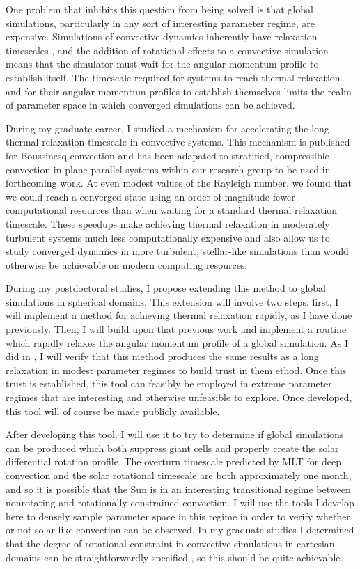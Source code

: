 \documentclass[aasms,12pt]{article}
\begin{document}
One problem that inhibits this question from being solved is that global simulations, particularly in any sort of interesting parameter regime, are expensive.
Simulations of convective dynamics inherently have relaxation timescales \citep{anders&all2018}, and the addition of rotational effects to a convective simulation means that the simulator must wait for the angular momentum profile to establish itself.
The timescale required for systems to reach thermal relaxation and for their angular momentum profiles to establish themselves limits the realm of parameter space in which converged simulations can be achieved.

During my graduate career, I studied a mechanism for accelerating the long thermal relaxation timescale in convective systems.
This mechanism is published for Boussinesq convection \citep{anders&all2018} and has been adapated to stratified, compressible convection in plane-parallel systems within our research group to be used in forthcoming work.
At even modest values of the Rayleigh number, we found that we could reach a converged state using an order of magnitude fewer computational resources than when waiting for a standard thermal relaxation timescale.
These speedups make achieving thermal relaxation in moderately turbulent systems much less computationally expensive and also allow us to study converged dynamics in more turbulent, stellar-like simulations than would otherwise be achievable on modern computing resources.

During my postdoctoral studies, I propose extending this method to global simulations in spherical domains.
This extension will involve two steps: first, I will implement a method for achieving thermal relaxation rapidly, as I have done previously.
Then, I will build upon that previous work and implement a routine which rapidly relaxes the angular momentum profile of a global simulation.
As I did in \citet{anders&all2018}, I will verify that this method produces the same results as a long relaxation in modest parameter regimes to build trust in them ethod.
Once this trust is established, this tool can feasibly be employed in extreme parameter regimes that are interesting and otherwise unfeasible to explore.
Once developed, this tool will of course be made publicly available.

After developing this tool, I will use it to try to determine if global simulations can be produced which both suppress giant cells and properly create the solar differential rotation profile.
The overturn timescale predicted by MLT for deep convection and the solar rotational timescale are both approximately one month, and so it is possible that the Sun is in an interesting transitional regime between nonrotating and rotationally constrained convection.
I will use the tools I develop here to densely sample parameter space in this regime in order to verify whether or not solar-like convection can be observed.
In my graduate studies I determined that the degree of rotational constraint in convective simulations in cartesian domains can be straightforwardly specified \citep{anders&all2019}, so this should be quite achievable.
\end{document}
